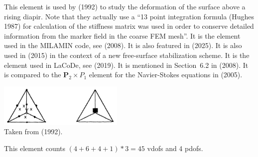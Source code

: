 This element is used by \textcite{popo92} (1992) to study the deformation of 
the surface above a rising diapir. Note that they actually use a 
{\color{darkgray} ``13 point integration formula (Hughes 1987) for calculation of the stiffness matrix was 
used in order to conserve detailed information from the marker field in the coarse FEM mesh''}. 
It is the element used in the MILAMIN code, see \textcite{daks08} (2008).
It is also featured in \textcite{thba25} (2025).
It is also used in \textcite{anmp15} (2015) in the context of a new free-surface stabilization scheme. 
It is the element used in LaCoDe, see \textcite{demh19} (2019).
It is mentioned in Section~6.2 in \textcite{bobf08} (2008).
It is compared to the ${\bm P}_2\times P_1$ element for the Navier-Stokes equations in 
\textcite{krba05} (2005).

\begin{center}
\includegraphics[width=6cm]{images/pair_cr/cr}\\
{\captionfont Taken from \textcite{begt92} (1992).}
\end{center}

This element counts $(4+6+4+1)*3=45$ vdofs and 4 pdofs.

